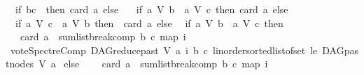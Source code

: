 \begin{isabellebody}
\ \ if\ {\isacharparenleft}{\kern0pt}b{\isacharequal}{\kern0pt}c{\isacharparenright}{\kern0pt}\ \ then\ card\ a\ else\ \isanewline
\ \ if\ {\isacharparenleft}{\kern0pt}{\isacharparenleft}{\kern0pt}a\ {\isasymrightarrow}\isactrlsup {\isacharasterisk}{\kern0pt}\isactrlbsub V\isactrlesub \ b{\isacharparenright}{\kern0pt}\ {\isasymand}\ {\isasymnot}{\isacharparenleft}{\kern0pt}a\ {\isasymrightarrow}\isactrlsup {\isacharplus}{\kern0pt}\isactrlbsub V\isactrlesub \ c{\isacharparenright}{\kern0pt}{\isacharparenright}{\kern0pt}\ then\ card\ a\ else\isanewline
\ \ if\ {\isacharparenleft}{\kern0pt}{\isacharparenleft}{\kern0pt}a\ {\isasymrightarrow}\isactrlsup {\isacharasterisk}{\kern0pt}\isactrlbsub V\isactrlesub \ c{\isacharparenright}{\kern0pt}\ {\isasymand}\ {\isasymnot}{\isacharparenleft}{\kern0pt}a\ {\isasymrightarrow}\isactrlsup {\isacharplus}{\kern0pt}\isactrlbsub V\isactrlesub \ b{\isacharparenright}{\kern0pt}{\isacharparenright}{\kern0pt}\ then\ {\isacharminus}{\kern0pt}\ card\ a\ else\isanewline
\ \ if\ {\isacharparenleft}{\kern0pt}{\isacharparenleft}{\kern0pt}a\ {\isasymrightarrow}\isactrlsup {\isacharplus}{\kern0pt}\isactrlbsub V\isactrlesub \ b{\isacharparenright}{\kern0pt}\ {\isasymand}\ {\isacharparenleft}{\kern0pt}a\ {\isasymrightarrow}\isactrlsup {\isacharplus}{\kern0pt}\isactrlbsub V\isactrlesub \ c{\isacharparenright}{\kern0pt}{\isacharparenright}{\kern0pt}\ then\ \isanewline
\ \ \ {\isacharparenleft}{\kern0pt}card\ a{\isacharparenright}{\kern0pt}\ {\isacharasterisk}{\kern0pt}\ {\isacharparenleft}{\kern0pt}sumlist{\isacharunderscore}{\kern0pt}break{\isacharunderscore}{\kern0pt}comp\ b\ c\ {\isacharparenleft}{\kern0pt}map\ {\isacharparenleft}{\kern0pt}{\isasymlambda}i{\isachardot}{\kern0pt}\isanewline
\ {\isacharparenleft}{\kern0pt}vote{\isacharunderscore}{\kern0pt}SpectreComp\ {\isacharparenleft}{\kern0pt}DAG{\isachardot}{\kern0pt}reduce{\isacharunderscore}{\kern0pt}past\ V\ a{\isacharparenright}{\kern0pt}\ i\ b\ c{\isacharparenright}{\kern0pt}{\isacharparenright}{\kern0pt}\ {\isacharparenleft}{\kern0pt}linorder{\isachardot}{\kern0pt}sorted{\isacharunderscore}{\kern0pt}list{\isacharunderscore}{\kern0pt}of{\isacharunderscore}{\kern0pt}set\ le\ {\isacharparenleft}{\kern0pt}{\isacharparenleft}{\kern0pt}DAG{\isachardot}{\kern0pt}past{\isacharunderscore}{\kern0pt}nodes\ V\ a{\isacharparenright}{\kern0pt}{\isacharparenright}{\kern0pt}{\isacharparenright}{\kern0pt}{\isacharparenright}{\kern0pt}{\isacharparenright}{\kern0pt}\isanewline
\ else\ \isanewline
\ \ \ {\isacharparenleft}{\kern0pt}card\ a{\isacharparenright}{\kern0pt}\ {\isacharasterisk}{\kern0pt}\ sumlist{\isacharunderscore}{\kern0pt}break{\isacharunderscore}{\kern0pt}comp\ b\ c\ {\isacharparenleft}{\kern0pt}map\ {\isacharparenleft}{\kern0pt}{\isasymlambda}i{\isachardot}{\kern0pt}\isanewline

\end{isabellebody}
